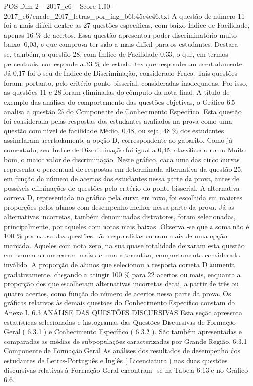 \begin{textsample}{POS Dim 2 – 2017\_c6 – Score 1.00 – 2017\_c6/enade\_2017\_letras\_por\_ing\_b6b45c4c46.txt}
A questão de número 11 foi a mais difícil dentre as 27 questões específicas, com baixo Índice de Facilidade, apenas 16 \% de acertos.
Essa questão apresentou poder discriminatório muito baixo, 0,03, o que comprova ter sido a mais difícil para os estudantes.
Destaca -se, também, a questão 28, com Índice de Facilidade 0,33, o que, em termos percentuais, corresponde a 33 \% de estudantes que responderam acertadamente.
Já 0,17 foi o seu de Índice de Discriminação, considerado Fraco.
Tais questões foram, portanto, pelo critério ponto-bisserial, consideradas inadequadas.
Por isso, as questões 11 e 28 foram eliminadas do cômputo da nota final.
A título de exemplo das análises do comportamento das questões objetivas, o Gráfico 6.5 analisa a questão 25 do Componente de Conhecimento Específico.
Esta questão foi considerada pelas respostas dos estudantes avaliados na prova como uma questão com nível de facilidade Médio, 0,48, ou seja, 48 \% dos estudantes assinalaram acertadamente a opção D, correspondente ao gabarito.
Como já comentado, seu Índice de Discriminação foi igual a 0,45, classificado como Muito bom, o maior valor de discriminação.
Neste gráfico, cada uma das cinco curvas representa o percentual de respostas em determinada alternativa da questão 25, em função do número de acertos dos estudantes nessa parte da prova, antes de possíveis eliminações de questões pelo critério do ponto-bisserial.
A alternativa correta D, representada no gráfico pela curva em roxo, foi escolhida em maiores proporções pelos alunos com desempenho melhor nessa parte da prova.
Já as alternativas incorretas, também denominadas distratores, foram selecionadas, principalmente, por aqueles com notas mais baixas.
Observa -se que a soma não é 100 \% por causa das questões não respondidas ou com mais de uma opção marcada.
Aqueles com nota zero, na sua quase totalidade deixaram esta questão em branco ou marcaram mais de uma alternativa, comportamento considerado inválido.
A proporção de alunos que selecionou a resposta correta D aumenta gradativamente, chegando a atingir 100 \% para 22 acertos ou mais, enquanto a proporção dos que escolheram alternativas incorretas decai, a partir de três ou quatro acertos, como função do número de acertos nessa parte da prova.
Os gráficos relativos às demais questões do Conhecimento Específico constam do Anexo I. 6.3 ANÁLISE DAS QUESTÕES DISCURSIVAS Esta seção apresenta estatísticas selecionadas e histogramas das Questões Discursivas de Formação Geral ( 6.3.1 ) e Conhecimento Específico ( 6.3.2 ).
São também apresentadas e comparadas as médias de subpopulações caracterizadas por Grande Região. 6.3.1 Componente de Formação Geral As análises dos resultados de desempenho dos estudantes de Letras-Português e Inglês ( Licenciatura ) nas duas questões discursivas relativas à Formação Geral encontram -se na Tabela 6.13 e no Gráfico 6.6.

\end{textsample}

